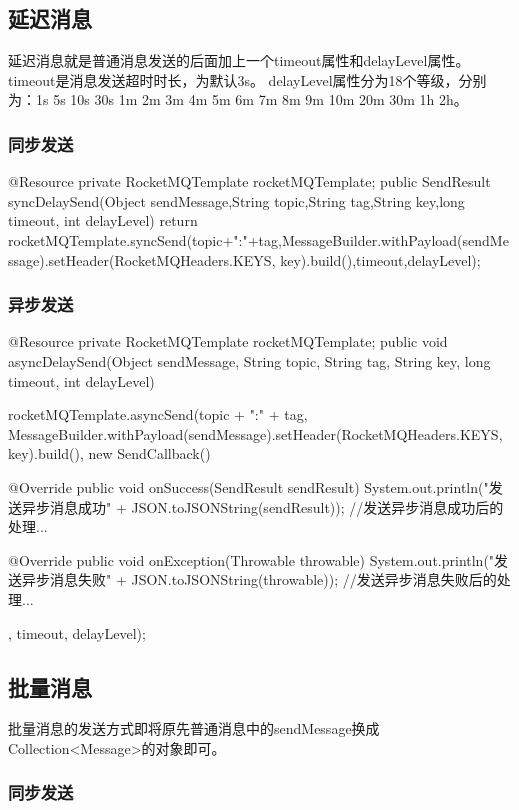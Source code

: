 \documentclass[11pt, a4paper, oneside, fontset=none]{ctexbook}
\begin{document}
\subsection{延迟消息}
延迟消息就是普通消息发送的后面加上一个timeout属性和delayLevel属性。
timeout是消息发送超时时长，为默认3s。
delayLevel属性分为18个等级，分别为：1s 5s 10s 30s 1m 2m 3m 4m 5m 6m 7m 8m 9m 10m 20m 30m 1h 2h。
\subsubsection{同步发送}
\begin{java}[caption=延迟消息同步发送方式]
@Resource
private RocketMQTemplate rocketMQTemplate;
public SendResult syncDelaySend(Object sendMessage,String topic,String tag,String key,long timeout, int delayLevel) {
  return rocketMQTemplate.syncSend(topic+":"+tag,MessageBuilder.withPayload(sendMessage).setHeader(RocketMQHeaders.KEYS, key).build(),timeout,delayLevel);
}
\end{java}

\subsubsection{异步发送}
\begin{java}[caption=延迟消息异步发送方式]
@Resource
private RocketMQTemplate rocketMQTemplate;
public void asyncDelaySend(Object sendMessage, String topic, String tag, String key, long timeout, int delayLevel) {
  rocketMQTemplate.asyncSend(topic + ":" + tag, MessageBuilder.withPayload(sendMessage).setHeader(RocketMQHeaders.KEYS, key).build(), new SendCallback() {
    @Override
    public void onSuccess(SendResult sendResult) {
      System.out.println("发送异步消息成功" + JSON.toJSONString(sendResult));
      //发送异步消息成功后的处理...
    }

    @Override
    public void onException(Throwable throwable) {
      System.out.println("发送异步消息失败" + JSON.toJSONString(throwable));
      //发送异步消息失败后的处理...
    }
  }, timeout, delayLevel);
}
\end{java}

\subsection{批量消息}
批量消息的发送方式即将原先普通消息中的sendMessage换成Collection<Message>的对象即可。
\subsubsection{同步发送}
\end{document}
